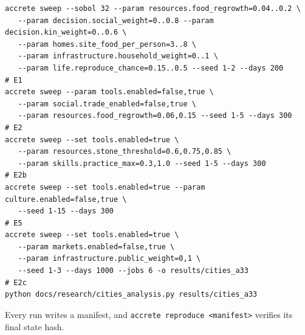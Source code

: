 \documentclass[11pt]{article}
\theoremstyle{definition}
\newcommand{\1}{\mathbf{1}}
\begin{document}
\begin{small}
\begin{verbatim}
accrete sweep --sobol 32 --param resources.food_regrowth=0.04..0.2 \
   --param decision.social_weight=0..0.8 --param decision.kin_weight=0..0.6 \
   --param homes.site_food_per_person=3..8 \
   --param infrastructure.household_weight=0..1 \
   --param life.reproduce_chance=0.15..0.5 --seed 1-2 --days 200      # E1
accrete sweep --param tools.enabled=false,true \
   --param social.trade_enabled=false,true \
   --param resources.food_regrowth=0.06,0.15 --seed 1-5 --days 300    # E2
accrete sweep --set tools.enabled=true \
   --param resources.stone_threshold=0.6,0.75,0.85 \
   --param skills.practice_max=0.3,1.0 --seed 1-5 --days 300          # E2b
accrete sweep --set tools.enabled=true --param culture.enabled=false,true \
   --seed 1-15 --days 300                                             # E5
accrete sweep --set tools.enabled=true \
   --param markets.enabled=false,true \
   --param infrastructure.public_weight=0,1 \
   --seed 1-3 --days 1000 --jobs 6 -o results/cities_a33              # E2c
python docs/research/cities_analysis.py results/cities_a33
\end{verbatim}
\end{small}
Every run writes a manifest, and \texttt{accrete reproduce <manifest>} verifies its final state hash.
\end{document}
